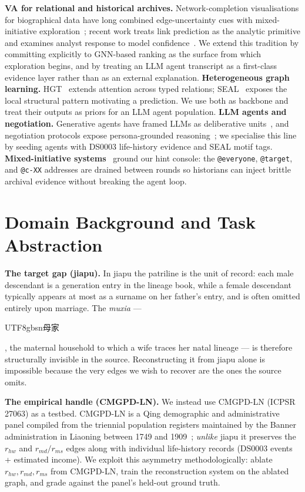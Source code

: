 \documentclass[review]{vgtc}                  %
\begin{document}
\textbf{VA for relational and historical archives.}
Network-completion visualisations for biographical data have long
combined edge-uncertainty cues with mixed-initiative
exploration~\cite{vis-prosopography};
recent work treats link prediction as the analytic primitive and
examines analyst response to model
confidence~\cite{vis-link-prediction-confidence}. We extend this
tradition by committing explicitly to GNN-based ranking as the surface
from which exploration begins, and by treating an LLM agent transcript
as a first-class evidence layer rather than as an external explanation.
\textbf{Heterogeneous graph learning.} HGT~\cite{hu2020hgt} extends
attention across typed relations; SEAL~\cite{zhang2018seal} exposes
the local structural pattern motivating a prediction. We use both as
backbone and treat their outputs as priors for an LLM agent population.
\textbf{LLM agents and negotiation.}
Generative agents have framed LLMs as deliberative
units~\cite{park2023generative}, and negotiation protocols expose
persona-grounded reasoning~\cite{abdelnabi2023negotiation}; we
specialise this line by seeding agents with DS0003 life-history
evidence and SEAL motif tags. \textbf{Mixed-initiative
systems}~\cite{endert2014mixed} ground our hint console: the
\texttt{@everyone}, \texttt{@target}, and \texttt{@c-XX} addresses are
drained between rounds so historians can inject brittle archival
evidence without breaking the agent loop.

\section{Domain Background and Task Abstraction}
\label{sec:domain}

\textbf{The target gap (jiapu).} In jiapu the patriline is the unit of
record: each male descendant is a generation entry in the lineage
book, while a female descendant typically appears at most as a
surname on her father's entry, and is often omitted entirely upon
marriage. The \emph{muxia} ---
\begin{CJK*}{UTF8}{gbsn}母家\end{CJK*}, the maternal household to which
a wife traces her natal lineage --- is therefore structurally invisible
in the source. Reconstructing it from jiapu alone is impossible
because the very edges we wish to recover are the ones the source
omits.

\textbf{The empirical handle (CMGPD-LN).} We instead use CMGPD-LN
(ICPSR 27063) as a testbed. CMGPD-LN is a Qing demographic and
administrative panel compiled from the triennial population registers
maintained by the Banner administration in Liaoning between 1749 and
1909~\cite{cmgpd-ln-2010}; \emph{unlike} jiapu it preserves the
$r_{hw}$ and $r_{md}/r_{ms}$ edges along with individual life-history
records (DS0003 events + estimated income). We exploit this asymmetry
methodologically: ablate $r_{hw}, r_{md}, r_{ms}$ from CMGPD-LN,
train the reconstruction system on the ablated graph, and grade
against the panel's held-out ground truth.
\end{document}
